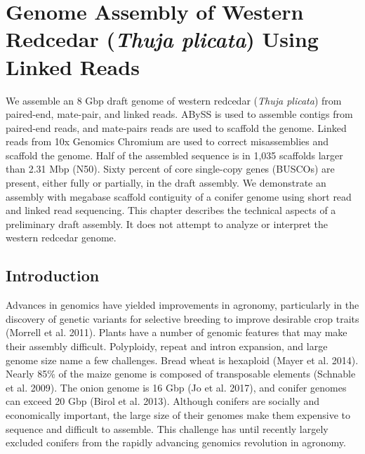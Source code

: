 \documentclass[
  12pt,
  oneside,
  openany]{book}
\begin{document}
\hypertarget{genome-assembly-of-western-redcedar-thuja-plicata-using-linked-reads}{%
\chapter{\texorpdfstring{Genome Assembly of Western Redcedar (\emph{Thuja plicata}) Using Linked Reads}{Genome Assembly of Western Redcedar (Thuja plicata) Using Linked Reads}}\label{genome-assembly-of-western-redcedar-thuja-plicata-using-linked-reads}}


We assemble an 8 Gbp draft genome of western redcedar (\emph{Thuja plicata}) from paired-end, mate-pair, and linked reads. ABySS is used to assemble contigs from paired-end reads, and mate-pairs reads are used to scaffold the genome. Linked reads from 10x Genomics Chromium are used to correct misassemblies and scaffold the genome. Half of the assembled sequence is in 1,035 scaffolds larger than 2.31 Mbp (N50). Sixty percent of core single-copy genes (BUSCOs) are present, either fully or partially, in the draft assembly. We demonstrate an assembly with megabase scaffold contiguity of a conifer genome using short read and linked read sequencing. This chapter describes the technical aspects of a preliminary draft assembly. It does not attempt to analyze or interpret the western redcedar genome.

\hypertarget{introduction-6}{%
\section{Introduction}\label{introduction-6}}

Advances in genomics have yielded improvements in agronomy, particularly in the discovery of genetic variants for selective breeding to improve desirable crop traits (Morrell et al. 2011). Plants have a number of genomic features that may make their assembly difficult. Polyploidy, repeat and intron expansion, and large genome size name a few challenges. Bread wheat is hexaploid (Mayer et al. 2014). Nearly 85\% of the maize genome is composed of transposable elements (Schnable et al. 2009). The onion genome is 16 Gbp (Jo et al. 2017), and conifer genomes can exceed 20 Gbp (Birol et al. 2013). Although conifers are socially and economically important, the large size of their genomes make them expensive to sequence and difficult to assemble. This challenge has until recently largely excluded conifers from the rapidly advancing genomics revolution in agronomy.
\end{document}
